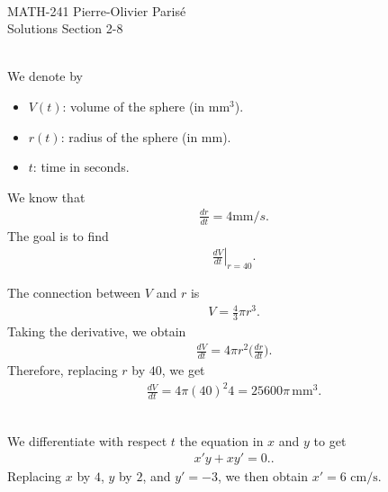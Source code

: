 


	\noindent \hrulefill \\
	MATH-241 \hfill Pierre-Olivier Paris{\'e}\\
	Solutions Section 2-8 \hfill \semester \\\vspace*{-1cm}
	
	\noindent\hrulefill
	
	\spc
	
	\\
	We denote by
		\begin{itemize}
		\item $V(t)$: volume of the sphere (in $\textrm{mm}^3$).
		\item $r(t)$: radius of the sphere (in $\textrm{mm}$).
		\item $t$: time in seconds.
		\end{itemize}
	
	We know that
		\begin{align*}
		\frac{dr}{dt} = 4\textrm{mm}/s .
		\end{align*}
	The goal is to find
		\begin{align*}
		\left. \frac{dV}{dt} \right|_{r = 40} .
		\end{align*}
		
	The connection between $V$ and $r$ is
		\begin{align*}
		V = \frac{4}{3} \pi r^3 .
		\end{align*}
	Taking the derivative, we obtain
		\begin{align*}
		\frac{dV}{dt} = 4 \pi r^2 \big( \frac{dr}{dt} \big).
		\end{align*}
	Therefore, replacing $r$ by $40$, we get
		\begin{align*}
		\frac{dV}{dt} = 4 \pi (40)^2 4 = 25600 \pi\,  \textrm{mm}^3 .
		\end{align*}
	
	\spc
	
	\\
	We differentiate with respect $t$ the equation in $x$ and $y$ to get
		\begin{align*}
		x'y + x y' = 0..
		\end{align*}
	Replacing $x$ by $4$, $y$ by $2$, and $y' = -3$, we then obtain $x' = 6 \text{ cm/s}$.
	
	\spc
	
